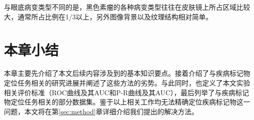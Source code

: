 与眼底病变类型不同的是，黑色素瘤的各种病变类型往往在皮肤镜上所占区域比较大，通常所占比例在1/3以上，另外图像背景以及纹理结构相对简单。

\section{本章小结}
本章主要先介绍了本文后续内容涉及到的基本知识要点。接着介绍了与疾病标记物定位任务相关的研究进展并阐述了这些方法的劣势。与此同时，也定义了本文实验相关评价标准（ROC曲线及其AUC和P-R曲线及其AUC），最后列举了与疾病标记物定位任务相关的部分数据集。鉴于以上相关工作均无法精确定位疾病标记物这一问题，本文将在第\ref{sec:method}章详细介绍我们提出的解决方法。

